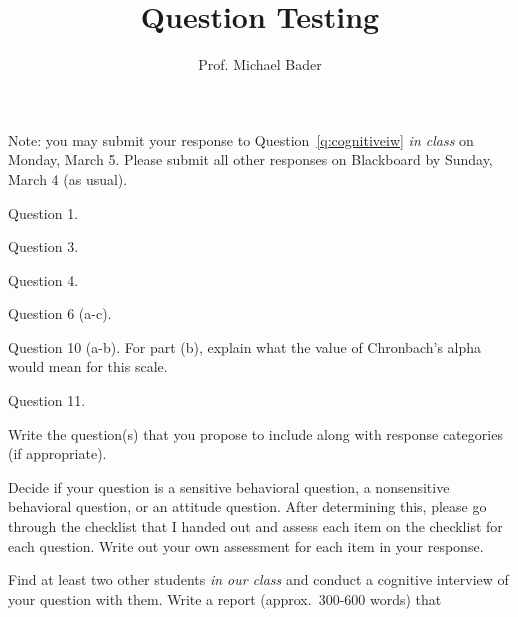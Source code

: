 \documentclass[11pt]{homework}
\title{Question Testing}
\author{Prof. Michael Bader}
\begin{document}
\maketitle 

\noindent Note: you may submit your response to Question~\ref{q:cognitiveiw} \emph{in class} on Monday, March 5. Please submit all other responses on Blackboard by Sunday, March 4 (as usual). 

\begin{questions}

\question[1.5] Question 1. 

\question[1] Question 3. 

\question[2] Question 4. 

\question[3] Question 6 (a-c). 

\question[2] Question 10 (a-b). For part (b), explain what the value of Chronbach's alpha would mean for this scale. 

\question[2] Question 11. 


\question[1] Write the question(s) that you propose to include along with response categories (if appropriate). 

\question[3] Decide if your question is a sensitive behavioral question, a nonsensitive behavioral question, or an attitude question. After determining this, please go through the checklist that I handed out and assess each item on the checklist for each question. Write out your own assessment for each item in your response. 

\question Find at least two other students \emph{in our class} and conduct a cognitive interview of your question with them. Write a report (approx.\ 300-600 words) that 
\label{q:cognitiveiw}




\end{questions}
\end{document}
